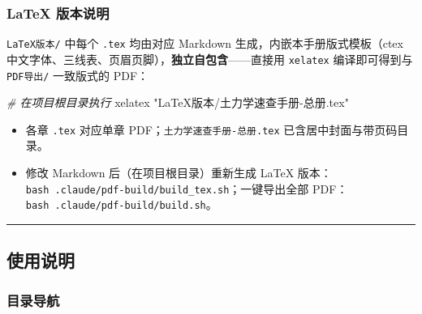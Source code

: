 \documentclass[
]{article}
\newenvironment{Shaded}{}{}
\newcommand{\CommentTok}[1]{\textcolor[rgb]{0.38,0.63,0.69}{\textit{#1}}}
\newcommand{\ExtensionTok}[1]{#1}
\newcommand{\StringTok}[1]{\textcolor[rgb]{0.25,0.44,0.63}{#1}}
\providecommand{\tightlist}{%
  \setlength{\itemsep}{0pt}\setlength{\parskip}{0pt}}
\begin{document}
\subsubsection{LaTeX 版本说明}\label{latex-ux7248ux672cux8bf4ux660e}

\texttt{LaTeX版本/} 中每个 \texttt{.tex} 均由对应 Markdown
生成，内嵌本手册版式模板（ctex
中文字体、三线表、页眉页脚），\textbf{独立自包含}------直接用
\texttt{xelatex} 编译即可得到与 \texttt{PDF导出/} 一致版式的 PDF：

\begin{Shaded}
\begin{Highlighting}[]
\CommentTok{\# 在项目根目录执行}
\ExtensionTok{xelatex} \StringTok{"LaTeX版本/土力学速查手册{-}总册.tex"}
\end{Highlighting}
\end{Shaded}

\begin{itemize}
\tightlist
\item
  各章 \texttt{.tex} 对应单章 PDF；\texttt{土力学速查手册-总册.tex}
  已含居中封面与带页码目录。
\item
  修改 Markdown 后（在项目根目录）重新生成 LaTeX
  版本：\texttt{bash\ .claude/pdf-build/build\_tex.sh}；一键导出全部
  PDF：\texttt{bash\ .claude/pdf-build/build.sh}。
\end{itemize}

\begin{center}\rule{0.5\linewidth}{0.5pt}\end{center}

\subsection{使用说明}\label{ux4f7fux7528ux8bf4ux660e}

\subsubsection{目录导航}\label{ux76eeux5f55ux5bfcux822a}
\end{document}
